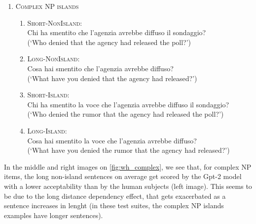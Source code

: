 \renewcommand{\labelenumi}{(\arabic{enumi})}
\begin{enumerate}
	\item \textsc{Complex NP islands}
	\renewcommand{\labelenumii}{\alph{enumii}.}
	\begin{enumerate}
		\item \textsc{Short-NonIsland:} \\
		Chi ha smentito che l'agenzia avrebbe diffuso il sondaggio? \\
		(`Who denied that the agency had released the poll?')
		\item \textsc{Long-NonIsland:} \\
		Cosa hai smentito che l'agenzia avrebbe diffuso? \\
		(`What have you denied that the agency had released?')
		\item \textsc{Short-Island:} \\
		Chi ha smentito la voce che l'agenzia avrebbe diffuso il sondaggio? \\
		(`Who denied the rumor that the agency had released the poll?')
		\item \textsc{Long-Island:} \\				
		Cosa hai smentito la voce che l'agenzia avrebbe diffuso? \\
		(`What have you denied the rumor that the agency had released?')
		
	\end{enumerate}
\end{enumerate}

In the middle and right images on \autoref{fig:wh_complex}, we see that, for complex NP items, the long non-island sentences on average get scored by the Gpt-2 model with a lower acceptability than by the human subjects (left image). This seems to be due to the long distance dependency effect, that gets exacerbated as a sentence increases in lenght (in these test suites, the complex NP islands examples have longer sentences).


